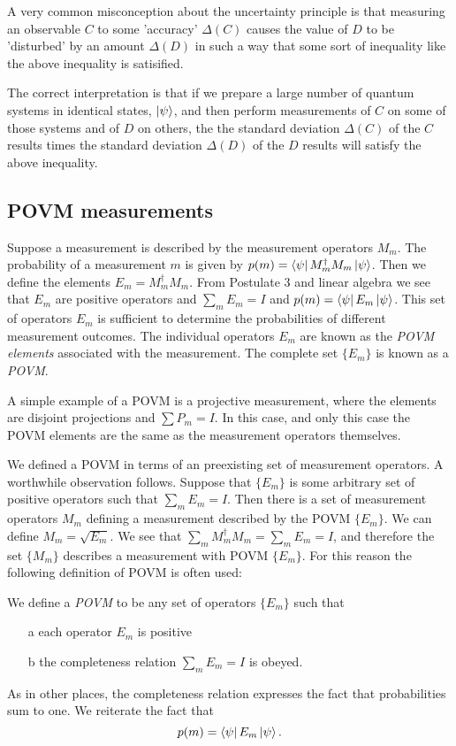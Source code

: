 \documentclass{article}
\begin{document}
A very common misconception about the uncertainty principle is that measuring an observable $C$ to some 'accuracy' $\Delta(C)$ causes the value of $D$ to be 'disturbed' by an amount $\Delta(D)$ in such a way that some sort of inequality like the above inequality is satisified.

The correct interpretation is that if we prepare a large number of quantum systems in identical states, $\ket\psi$, and then perform measurements of $C$ on some of those systems and of $D$ on others, the the standard deviation $\Delta(C)$ of the $C$ results times the standard deviation $\Delta(D)$ of the $D$ results will satisfy the above inequality.

\subsection{POVM measurements}

\begin{definition}
   Suppose a measurement is described by the measurement operators $M_m$. The probability of a measurement $m$ is given by $p(m)=\bra\psi M_m^\dagger M_m\ket\psi$. Then we define the elements $E_m=M_m^\dagger M_m$. From Postulate 3 and linear algebra we see that $E_m$ are positive operators and $\sum_m E_m=I$ and $p(m)=\bra\psi E_m\ket\psi$. This set of operators $E_m$ is sufficient to determine the probabilities of different measurement outcomes. The individual operators $E_m$ are known as the \textit{POVM elements} associated with the measurement. The complete set $\{E_m\}$ is known as a \textit{POVM}.
\end{definition}

A simple example of a POVM is a projective measurement, where the elements are disjoint projections and $\sum P_m=I$. In this case, and only this case the POVM elements are the same as the measurement operators themselves.

We defined a POVM in terms of an preexisting set of measurement operators. A worthwhile observation follows. Suppose that $\{E_m\}$ is some arbitrary set of positive operators such that $\sum_m E_m=I$. Then there is a set of measurement operators $M_m$ defining a measurement described by the POVM $\{E_m\}$. We can define $M_m=\sqrt{E_m}$. We see that $\sum_m M_m^\dagger M_m=\sum_mE_m = I$, and therefore the set $\{M_m\}$ describes a measurement with POVM $\{E_m\}$. For this reason the following definition  of POVM is often used:

\begin{definition}[POVM]
  We define a \textit{POVM} to be any set of operators $\{E_m\}$ such that
  \begin{itemize}
    \item[a] each operator $E_m$ is positive
    \item[b] the completeness relation $\sum_m E_m=I$ is obeyed.
  \end{itemize}
  As in other places, the completeness relation expresses the fact that probabilities sum to one. We reiterate the fact that
  \[p(m)=\bra\psi E_m\ket\psi.\]
\end{definition}
\end{document}
